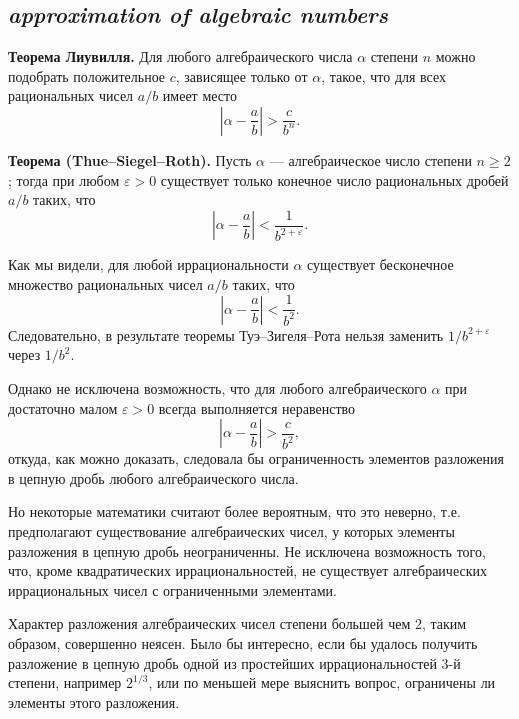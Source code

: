 \subsection*{ \textit{approximation of algebraic numbers}}
\begin{rusblock}
\textbf{Теорема Лиувилля.} Для любого алгебраического числа $\alpha$ степени $n$ можно подобрать положительное $c$, зависящее только от $\alpha$, такое, что для всех рациональных чисел $a/b$ имеет место
\[
\left|\alpha-\frac ab\right|>\frac{c}{b^n}.
\]

\textbf{Теорема (Thue--Siegel--Roth).} Пусть $\alpha$ --- алгебраическое число степени $n\ge2$; тогда при любом $\varepsilon>0$ существует только конечное число рациональных дробей $a/b$ таких, что
\[
\left|\alpha-\frac ab\right|<\frac1{b^{2+\varepsilon}}.
\]

Как мы видели, для любой иррациональности $\alpha$ существует бесконечное множество рациональных чисел $a/b$ таких, что
\[
\left|\alpha-\frac ab\right|<\frac1{b^2}.
\]
Следовательно, в результате теоремы Туэ--Зигеля--Рота нельзя заменить $1/b^{2+\varepsilon}$ через $1/b^2$.

Однако не исключена возможность, что для любого алгебраического $\alpha$ при достаточно малом $\varepsilon>0$ всегда выполняется неравенство
\[
\left|\alpha-\frac ab\right|>\frac{c}{b^2},
\]
откуда, как можно доказать, следовала бы ограниченность элементов разложения в цепную дробь любого алгебраического числа.

Но некоторые математики считают более вероятным, что это неверно, т.е. предполагают существование алгебраических чисел, у которых элементы разложения в цепную дробь неограниченны. Не исключена возможность того, что, кроме квадратических иррациональностей, не существует алгебраических иррациональных чисел с ограниченными элементами.

Характер разложения алгебраических чисел степени большей чем $2$, таким образом, совершенно неясен. Было бы интересно, если бы удалось получить разложение в цепную дробь одной из простейших иррациональностей 3-й степени, например $2^{1/3}$, или по меньшей мере выяснить вопрос, ограничены ли элементы этого разложения.
\end{rusblock}

